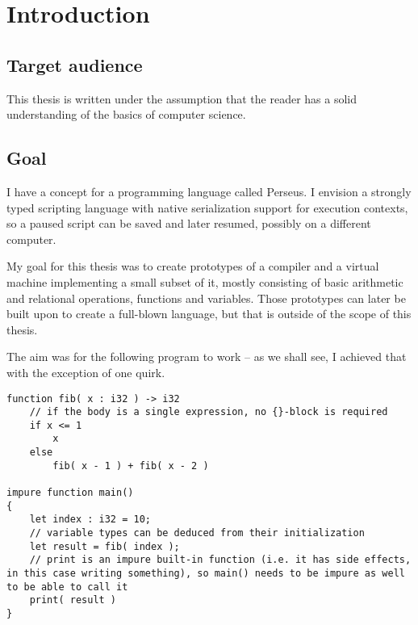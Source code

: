 
\chapter{Introduction} %

    
    \section{Target audience}
    This thesis is written under the assumption that the reader has a solid understanding of the basics of computer science.

	\section{Goal} %
	
	I have a concept for a programming language called Perseus. I envision a strongly typed scripting language with native serialization support for execution contexts, so a paused script can be saved and later resumed, possibly on a different computer.
	
	My goal for this thesis was to create prototypes of a compiler and a virtual machine implementing a small subset of it, mostly consisting of basic arithmetic and relational operations, functions and variables. Those prototypes can later be built upon to create a full-blown language, but that is outside of the scope of this thesis.
	
	The aim was for the following program to work -- as we shall see, I achieved that with the exception of one quirk.
	
	\lstperseus
	\begin{lstlisting}[caption={Desired target language example},label={lst:target_language}]
function fib( x : i32 ) -> i32
    // if the body is a single expression, no {}-block is required
    if x <= 1
        x
    else
        fib( x - 1 ) + fib( x - 2 )

impure function main()
{
	let index : i32 = 10;
	// variable types can be deduced from their initialization
	let result = fib( index );
	// print is an impure built-in function (i.e. it has side effects, in this case writing something), so main() needs to be impure as well to be able to call it
	print( result )
}
	\end{lstlisting}
	
